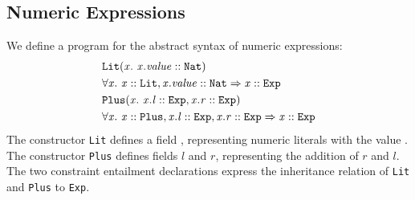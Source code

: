 \subsection{Numeric Expressions}
We define a program for the abstract syntax of numeric expressions:
%
\begin{align*}
&\mathit{\texttt{Lit}}(\mathit{x}.\ \mathit{\mathit{x.value} :: \mathit{\texttt{Nat}}})\\
& \forall \mathit{x}.\ \mathit{\mathit{x} :: \mathit{\texttt{Lit}}, \mathit{x.value} :: \mathit{\texttt{Nat}}} \Rightarrow \mathit{\mathit{x} :: \mathit{\texttt{Exp}}}\\
&\mathit{\texttt{Plus}}(\mathit{x}.\ \mathit{\mathit{x.l} :: \mathit{\texttt{Exp}}, \mathit{x.r} :: \mathit{\texttt{Exp}}})\\
& \forall \mathit{x}.\ \mathit{\mathit{x} :: \mathit{\texttt{Plus}}, \mathit{x.l} :: \mathit{\texttt{Exp}}, \mathit{x.r} :: \mathit{\texttt{Exp}}} \Rightarrow \mathit{\mathit{x} :: \mathit{\texttt{Exp}}}
\end{align*}
%
The constructor \texttt{Lit} defines a field ,
representing numeric literals with the value .
The constructor \texttt{Plus} defines fields $l$ and $r$,
representing the addition of $r$ and $l$.
The two constraint entailment declarations express
the inheritance relation of
\texttt{Lit} and \texttt{Plus} to \texttt{Exp}.

